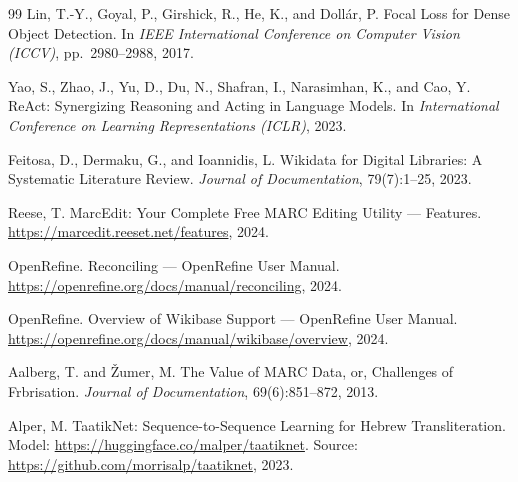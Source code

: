 \documentclass[Afour,sageh,times]{sagej}
\begin{document}
\begin{thebibliography}{99}
Lin, T.-Y., Goyal, P., Girshick, R., He, K., and Doll\'{a}r, P.
\newblock Focal Loss for Dense Object Detection.
\newblock In \emph{IEEE International Conference on Computer Vision (ICCV)}, pp.~2980--2988, 2017.

Yao, S., Zhao, J., Yu, D., Du, N., Shafran, I., Narasimhan, K., and Cao, Y.
\newblock ReAct: Synergizing Reasoning and Acting in Language Models.
\newblock In \emph{International Conference on Learning Representations (ICLR)}, 2023.

Feitosa, D., Dermaku, G., and Ioannidis, L.
\newblock Wikidata for Digital Libraries: A Systematic Literature Review.
\newblock \emph{Journal of Documentation}, 79(7):1--25, 2023.

Reese, T.
\newblock MarcEdit: Your Complete Free MARC Editing Utility --- Features.
\newblock \url{https://marcedit.reeset.net/features}, 2024.

OpenRefine.
\newblock Reconciling --- OpenRefine User Manual.
\newblock \url{https://openrefine.org/docs/manual/reconciling}, 2024.

OpenRefine.
\newblock Overview of Wikibase Support --- OpenRefine User Manual.
\newblock \url{https://openrefine.org/docs/manual/wikibase/overview}, 2024.

Aalberg, T. and \v{Z}umer, M.
\newblock The Value of MARC Data, or, Challenges of Frbrisation.
\newblock \emph{Journal of Documentation}, 69(6):851--872, 2013.

Alper, M.
\newblock TaatikNet: Sequence-to-Sequence Learning for Hebrew Transliteration.
\newblock Model: \url{https://huggingface.co/malper/taatiknet}. Source: \url{https://github.com/morrisalp/taatiknet}, 2023.

\end{thebibliography}
\end{document}

